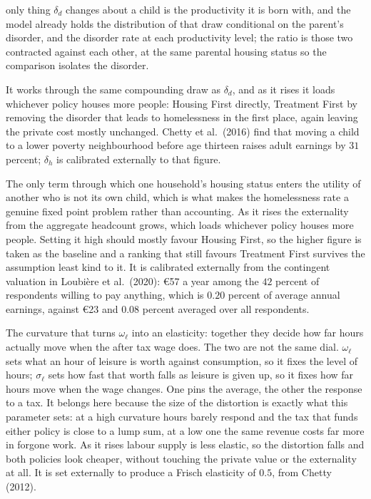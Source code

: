 \documentclass[10pt]{article}
\begin{document}
\begin{description}
only thing $\delta_d$ changes about a child is the productivity it is born with,
and the model already holds the distribution of that draw conditional on the
parent's disorder, and the disorder rate at each productivity level; the ratio is
those two contracted against each other, at the same parental housing status so
the comparison isolates the disorder.
\item[$\delta_h$, what the child loses to homelessness.] It works through the same
compounding draw as $\delta_d$, and as it rises it loads whichever policy houses
more people: Housing First directly, Treatment First by removing the disorder that
leads to homelessness in the first place, again leaving
the private cost mostly unchanged. Chetty et al.\ (2016) find that moving a child to a
lower poverty neighbourhood before age thirteen raises adult earnings by $31$
percent; $\delta_h$ is calibrated externally to that figure.
\item[$\kappa_x$, the disamenity of homelessness.]\label{sec:fleftout} The only term through which one
household's housing status enters the utility of another who is not its own child,
which is what makes the homelessness rate a genuine fixed point problem rather than
accounting. As it rises the externality from the aggregate headcount
grows, which loads whichever policy houses more people. Setting it high should
mostly favour Housing First, so the higher figure is taken as the baseline and a ranking
that still favours Treatment First survives the assumption least kind to it. It is
calibrated externally from the contingent valuation in Loubi\`ere et al.\ (2020):
\euro{}57 a year among the $42$ percent of respondents willing to pay anything,
which is $0.20$ percent of average annual earnings, against \euro{}23 and $0.08$
percent averaged over all respondents.
\item[$\sigma_{\ell}$, the curvature on leisure.]
The curvature that turns $\omega_{\ell}$ into an elasticity: together
they decide how far hours actually move when the after tax wage does. The two are
not the same dial. $\omega_{\ell}$ sets what an hour of leisure is worth against
consumption, so it fixes the level of hours; $\sigma_{\ell}$ sets how fast that
worth falls as leisure is given up, so it fixes how far hours move when the wage
changes. One pins the average, the other the response to a tax. It belongs
here because the size of the
distortion is exactly what this parameter sets: at a high curvature hours barely
respond and the tax that funds either policy is close to a lump sum, at a low one
the same revenue costs far more in forgone work. As it rises labour supply is less
elastic, so the distortion falls and both policies look cheaper, without touching
the private value or the externality at all. It is set externally to produce a
Frisch elasticity of $0.5$, from Chetty (2012).
\end{description}
\end{document}
